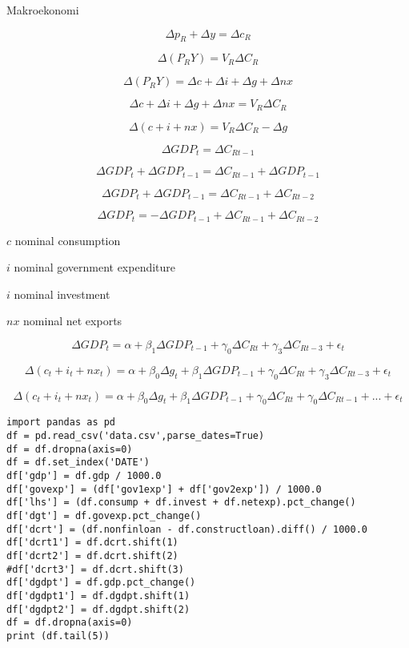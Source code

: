 \documentclass[12pt,fleqn]{article}\usepackage{../../common}
\begin{document}
Makroekonomi

$$ \Delta p_R + \Delta y = \Delta c_R$$

$$ \Delta (P_RY) = V_R\Delta C_R$$

$$ \Delta (P_RY) = \Delta c + \Delta i + \Delta g + \Delta nx $$

$$ \Delta c + \Delta i + \Delta g + \Delta nx = V_R\Delta C_R$$

$$ \Delta (c +  i +  nx) = V_R\Delta C_R - \Delta g$$

$$ \Delta GDP_t = \Delta C_{Rt-1}$$

$$ \Delta GDP_t + \Delta GDP_{t-1} = \Delta C_{Rt-1} + \Delta GDP_{t-1} $$

$$ \Delta GDP_t + \Delta GDP_{t-1} = \Delta C_{Rt-1} + \Delta C_{Rt-2}  $$

$$ \Delta GDP_t = - \Delta GDP_{t-1} + \Delta C_{Rt-1} + \Delta C_{Rt-2}  $$


$c$ nominal consumption 

$i$ nominal government expenditure

$i$ nominal investment 

$nx$ nominal net exports

$$ \Delta GDP_t = 
\alpha + \beta_1 \Delta GDP_{t-1} + 
\gamma_0 \Delta C_{Rt} + \gamma_3 \Delta C_{Rt-3} + \epsilon_t 
$$

$$ 
\Delta (c_t + i_t + nx_t) = 
\alpha + \beta_0 \Delta g_t + \beta_1 \Delta GDP_{t-1} + 
\gamma_0 \Delta C_{Rt} + \gamma_3 \Delta C_{Rt-3} + \epsilon_t 
$$

$$ 
\Delta (c_t + i_t + nx_t) =  
\alpha + \beta_0 \Delta g_t + 
\beta_1 \Delta GDP_{t-1} +  
\gamma_0 \Delta C_{Rt} + 
 \gamma_0 \Delta C_{Rt-1} + ...  + \epsilon_t 
$$


\begin{verbatim}
import pandas as pd
df = pd.read_csv('data.csv',parse_dates=True)
df = df.dropna(axis=0)
df = df.set_index('DATE')
df['gdp'] = df.gdp / 1000.0
df['govexp'] = (df['gov1exp'] + df['gov2exp']) / 1000.0
df['lhs'] = (df.consump + df.invest + df.netexp).pct_change() 
df['dgt'] = df.govexp.pct_change() 
df['dcrt'] = (df.nonfinloan - df.constructloan).diff() / 1000.0
df['dcrt1'] = df.dcrt.shift(1)
df['dcrt2'] = df.dcrt.shift(2)
#df['dcrt3'] = df.dcrt.shift(3)
df['dgdpt'] = df.gdp.pct_change()
df['dgdpt1'] = df.dgdpt.shift(1)
df['dgdpt2'] = df.dgdpt.shift(2)
df = df.dropna(axis=0)
print (df.tail(5))
\end{verbatim}
\end{document}
